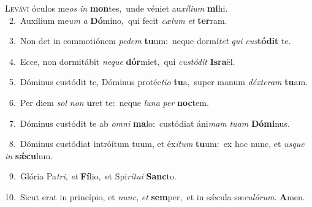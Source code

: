 \lettrine{\initial\textcolor{\initialcolor}{L}}{evávi} óculos me\textit{os} \textit{in} \textbf{mon}\-tes,~\star unde véniet au\-\textit{xí}\-\textit{li}\textit{um} \textbf{mi}\-hi.\\
{\numbfont\textcolor{\numbcolor}{~2.}}~Auxílium me\textit{um} \textit{a} \textbf{Dó}\-mino,~\star qui fecit \textit{cæ}\-\textit{lum} \textit{et} \textbf{ter}\-ram.\par
{\numbfont\textcolor{\numbcolor}{~3.}}~Non det in commotiónem \textit{pe}\-\textit{dem} \textbf{tu}\-um:~\star neque dormí\textit{tet} \textit{qui} \textit{cus}\-\textbf{tó}\textbf{dit} te.\par
{\numbfont\textcolor{\numbcolor}{~4.}}~Ecce, non dormitábit \textit{ne}\-\textit{que} \textbf{dór}\-miet,~\star qui \textit{cus}\-\textit{tó}\textit{dit} \textbf{Is}\-\textbf{ra}ël.\par
{\numbfont\textcolor{\numbcolor}{~5.}}~Dóminus custódit te, Dóminus protéc\-\textit{ti}\-\textit{o} \textbf{tu}\-a,~\star super manum \textit{déx}\-\textit{te}\textit{ram} \textbf{tu}\-am.\par
{\numbfont\textcolor{\numbcolor}{~6.}}~Per diem \textit{sol} \textit{non} \textbf{u}\-ret te:~\star neque \textit{lu}\-\textit{na} \textit{per} \textbf{noc}\-tem.\par
{\numbfont\textcolor{\numbcolor}{~7.}}~Dóminus custódit te ab \textit{om}\-\textit{ni} \textbf{ma}\-lo:~\star custódiat áni\textit{mam} \textit{tu}\-\textit{am} \textbf{Dó}\-\textbf{mi}nus.\par
{\numbfont\textcolor{\numbcolor}{~8.}}~Dóminus custódiat intróitum tuum, et éx\-\textit{i}\-\textit{tum} \textbf{tu}\-um:~\star ex hoc nunc, et \textit{us}\-\textit{que} \textit{in} \textbf{sǽ}\-\textbf{cu}lum.\par
{\numbfont\textcolor{\numbcolor}{~9.}}~Glória Pa\-\textit{tri}\-, \textit{et} \textbf{Fí}\-lio,~\star et Spi\-\textit{rí}\-\textit{tu}\textit{i} \textbf{Sanc}\-to.\par
{\numbfont\textcolor{\numbcolor}{10.}}~Sicut erat in princípio, et \textit{nunc}\-, \textit{et} \textbf{sem}\-per,~\star et in sǽcula sæ\-\textit{cu}\-\textit{ló}\textit{rum}. \textbf{A}\-men.\par

